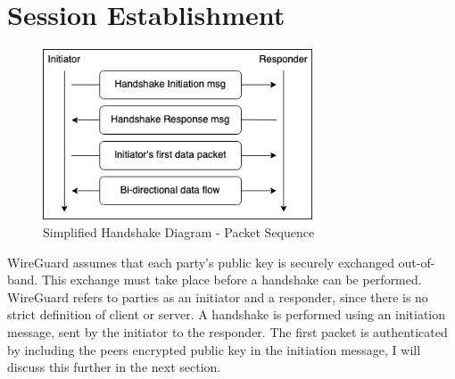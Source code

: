 \documentclass [11pt, proquest] {uwthesis}[2020/02/24]
\begin{document}
\section {Session Establishment}
\label{session_establish}
\begin{figure}
\includegraphics[width=8cm]{paper/images/simp-handshake_process.png}
\caption{Simplified Handshake Diagram - Packet Sequence }
\label{fig:simpleHandSeq}
\end{figure} 
WireGuard assumes that each party's public key is securely exchanged out-of-band. This exchange must take place before a handshake can be performed. 
WireGuard refers to parties as an initiator and a responder, since there is no strict definition of client or server. A handshake is performed using an initiation message, sent by the initiator to the responder. The first packet is authenticated by including the peers encrypted public key in the initiation message, I will discuss this further in the next section.
\end{document}
